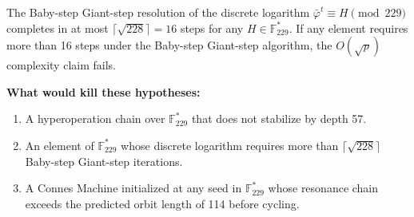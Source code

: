 \begin{hypothesis}\label{hyp:dlog}
The Baby-step Giant-step resolution of the discrete logarithm $\bar{\varphi}^t \equiv H \pmod{229}$ completes in at most $\lceil\sqrt{228}\rceil = 16$ steps for any $H \in \mathbb{F}_{229}^*$. If any element requires more than 16 steps under the Baby-step Giant-step algorithm, the $O(\sqrt{p})$ complexity claim fails.
\end{hypothesis}

\textbf{What would kill these hypotheses:}
\begin{enumerate}[noitemsep]
  \item A hyperoperation chain over $\mathbb{F}_{229}^*$ that does not stabilize by depth 57.
  \item An element of $\mathbb{F}_{229}^*$ whose discrete logarithm requires more than $\lceil\sqrt{228}\rceil$ Baby-step Giant-step iterations.
  \item A Connes Machine initialized at any seed in $\mathbb{F}_{229}^*$ whose resonance chain exceeds the predicted orbit length of 114 before cycling.
\end{enumerate}

